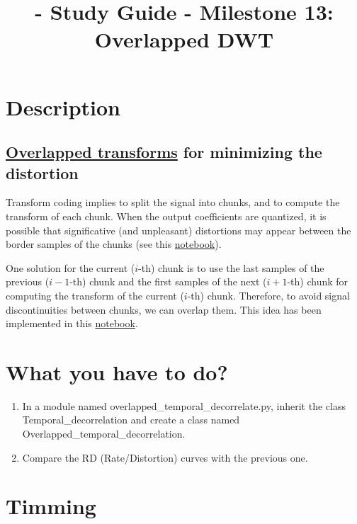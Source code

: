 
\title{\TM{} - Study Guide - Milestone 13: Overlapped DWT}

\maketitle

\section{Description}

\subsection{\href{https://en.wikipedia.org/wiki/Lapped_transform}{Overlapped transforms} for minimizing the distortion}
Transform coding implies to split the signal into chunks, and to
compute the transform of each chunk. When the output coefficients are
quantized, it is possible that significative (and unpleasant)
distortions may appear between the border samples of the chunks (see
this
\href{https://github.com/Tecnologias-multimedia/intercom/blob/master/docs/quantization_DWT.ipynb}{notebook}).

One solution for the current ($i$-th) chunk is to use the last samples
of the previous ($i-1$-th) chunk and the first samples of the next
($i+1$-th) chunk for computing the transform of the current ($i$-th)
chunk. Therefore, to avoid signal discontinuities between chunks, we
can overlap them. This idea has been implemented in this 
\href{https://github.com/Tecnologias-multimedia/intercom/blob/master/docs/overlapped_DWT.ipynb}{notebook}.

\section{What you have to do?}

\begin{enumerate}
\item In a module named overlapped\_temporal\_decorrelate.py, inherit
  the class Temporal\_decorrelation and create a class named
  Overlapped\_temporal\_decorrelation.
\item Compare the RD (Rate/Distortion) curves with the previous one.
\end{enumerate}

\section{Timming}

